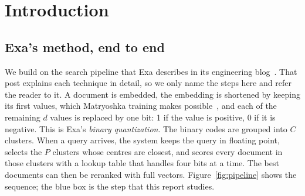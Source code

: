 \begin{abstract}
Exa stores document embeddings as short binary codes, groups them into clusters, and scores
the documents of a few clusters with a lookup table. This report asks whether two extra
index structures can reduce that scoring work: \emph{Bitplanes}, which split a cluster by
one sign bit at a time, and \emph{Backward Walk}, which looks up documents by a short key.
We derive the time, memory and recall of all three methods, use the formulas to choose each
method's best settings, and then measure every setting on one fixed dataset: one million
MS~MARCO passages and 200 queries. Only the index parameters change between runs. The
formulas predict the recorded operation counts exactly and the measured search times within
a few percent. On this dataset the original method is fastest at every recall target, and
the calculations show why: on real embeddings, one sign bit removes only about 15\% of the
documents, while a cluster boundary removes about 98\%. The same formulas also state the
conditions under which Bitplanes or Backward Walk would win.
\end{abstract}

\section{Introduction}
\subsection{Exa's method, end to end}
We build on the search pipeline that Exa describes in its engineering blog~\cite{exa}. That
post explains each technique in detail, so we only name the steps here and refer the reader
to it. A document is embedded, the embedding is shortened by keeping its first values, which Matryoshka training makes possible~\cite{mrl}, and each
of the remaining $d$ values is replaced by one bit: 1 if the value is positive, 0 if it is
negative. This is Exa's \emph{binary quantization}. The binary codes are grouped into $C$
clusters. When a query arrives, the system keeps the query in floating point, selects the $P$
clusters whose centres are closest, and scores every document in those clusters with a lookup
table that handles four bits at a time. The best documents can then be reranked with full
vectors. Figure~\ref{fig:pipeline} shows the sequence; the blue box is the step that this
report studies.

